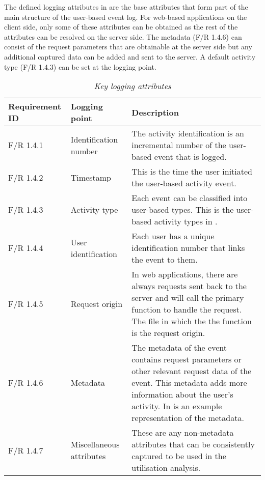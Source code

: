 
The defined logging attributes in  are the base attributes that form part of the main structure of the user-based event log. For web-based applications on the
client side, only some of these attributes can be obtained as the rest of the attributes can be resolved on the server side. The metadata (F/R 1.4.6) can consist of the request parameters that are
obtainable at the server side but any additional captured data can be added and sent to the server. A default activity type (F/R 1.4.3) can be set at the logging point. 

\begin{table}[!htb]
	\centering
	\small
	\caption[Key logging attributes]
	{\textit{Key logging attributes}}
	\label{tbl:ch2:keyLoggingAttributes}
	\begin{tabularx}{\textwidth}{|l|l|X|}
		\hline \textbf{Requirement ID} & \textbf{Logging point} & \textbf{Description} \\
		\hline F/R 1.4.1 & Identification number & The activity identification is an incremental number of the user-based event that is logged.\\
		\hline F/R 1.4.2 & Timestamp & This is the time the user initiated the user-based activity event.\\
		\hline F/R 1.4.3 & Activity type & Each event can be classified into user-based types. This is the user-based activity types in \Cref{tbl:ch2:userActivityTypes}.\\
		\hline F/R 1.4.4 & User identification & Each user has a unique identification number that links the event to them. \\
		\hline F/R 1.4.5 & Request origin & In web applications, there are always requests sent back to the server and will call the primary function to handle the request. The file in which the
		the function is the request origin. \\
		\hline F/R 1.4.6 & Metadata & The metadata of the event contains request parameters or other relevant request data of the event. This metadata adds more information about the user's activity.
		In \Cref{fig:Ch2_Metadata_Json_Example} is an example representation of the metadata. \\
		\hline F/R 1.4.7 & Miscellaneous attributes & These are any non-metadata attributes that can be consistently captured to be used in the utilisation analysis.\\ \hline
	\end{tabularx}
\end{table}

